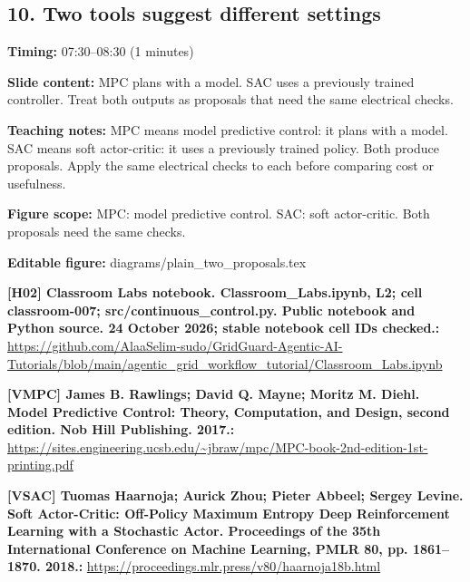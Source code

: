 \documentclass[10pt,letterpaper]{article}
\begin{document}
\subsection*{10. Two tools suggest different settings}
\textbf{Timing:} 07:30--08:30 (1 minutes)\par
\textbf{Slide content:} MPC plans with a model. SAC uses a previously trained controller.
Treat both outputs as proposals that need the same electrical checks.\par
\textbf{Teaching notes:} MPC means model predictive control: it plans with a model. SAC means soft actor-critic: it uses a previously trained policy. Both produce proposals. Apply the same electrical checks to each before comparing cost or usefulness.\par
\textbf{Figure scope:} MPC: model predictive control. SAC: soft actor-critic. Both proposals need the same checks.\par
\textbf{Editable figure:} diagrams/plain\_two\_proposals.tex\par
\textbf{[H02] Classroom Labs notebook. Classroom\_Labs.ipynb, L2; cell classroom-007; src/continuous\_control.py. Public notebook and Python source. 24 October 2026; stable notebook cell IDs checked.:} \href{https://github.com/AlaaSelim-sudo/GridGuard-Agentic-AI-Tutorials/blob/main/agentic_grid_workflow_tutorial/Classroom_Labs.ipynb}{\small\ttfamily https:/\allowbreak{}/\allowbreak{}github.\allowbreak{}com/\allowbreak{}AlaaSelim-\allowbreak{}sudo/\allowbreak{}GridGuard-\allowbreak{}Agentic-\allowbreak{}AI-\allowbreak{}Tutorials/\allowbreak{}blob/\allowbreak{}main/\allowbreak{}agentic\_\allowbreak{}grid\_\allowbreak{}workflow\_\allowbreak{}tutorial/\allowbreak{}Classroom\_\allowbreak{}Labs.\allowbreak{}ipynb}\par
\textbf{[VMPC] James B. Rawlings; David Q. Mayne; Moritz M. Diehl. Model Predictive Control: Theory, Computation, and Design, second edition. Nob Hill Publishing. 2017.:} \href{https://sites.engineering.ucsb.edu/~jbraw/mpc/MPC-book-2nd-edition-1st-printing.pdf}{\small\ttfamily https:/\allowbreak{}/\allowbreak{}sites.\allowbreak{}engineering.\allowbreak{}ucsb.\allowbreak{}edu/\allowbreak{}\textasciitilde{}jbraw/\allowbreak{}mpc/\allowbreak{}MPC-\allowbreak{}book-\allowbreak{}2nd-\allowbreak{}edition-\allowbreak{}1st-\allowbreak{}printing.\allowbreak{}pdf}\par
\textbf{[VSAC] Tuomas Haarnoja; Aurick Zhou; Pieter Abbeel; Sergey Levine. Soft Actor-Critic: Off-Policy Maximum Entropy Deep Reinforcement Learning with a Stochastic Actor. Proceedings of the 35th International Conference on Machine Learning, PMLR 80, pp. 1861--1870. 2018.:} \href{https://proceedings.mlr.press/v80/haarnoja18b.html}{\small\ttfamily https:/\allowbreak{}/\allowbreak{}proceedings.\allowbreak{}mlr.\allowbreak{}press/\allowbreak{}v80/\allowbreak{}haarnoja18b.\allowbreak{}html}\par
\end{document}
